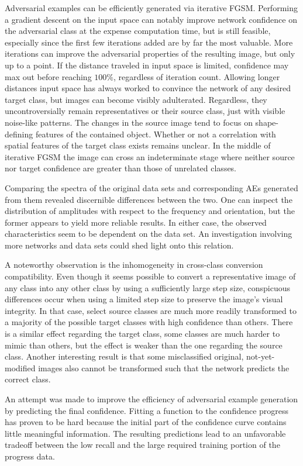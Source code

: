 \documentclass[11pt, a4paper]{article}
\begin{document}
Adversarial examples can be efficiently generated via iterative FGSM. Performing a gradient descent on the input space can notably improve network confidence on the adversarial class at the expense computation time, but is still feasible, especially since the first few iterations added are by far the most valuable. More iterations can improve the adversarial properties of the resulting image, but only up to a point. If the distance traveled in input space is limited, confidence may max out before reaching $100\%$, regardless of iteration count. Allowing longer distances input space has always worked to convince the network of any desired target class, but images can become visibly adulterated. Regardless, they uncontroversially remain representatives or their source class, just with visible noise-like patterns. The changes in the source image tend to focus on shape-defining features of the contained object. Whether or not a correlation with spatial features of the target class exists remains unclear. In the middle of iterative FGSM the image can cross an indeterminate stage where neither source nor target confidence are greater than those of unrelated classes.

Comparing the spectra of the original data sets and corresponding AEs generated from them revealed discernible differences between the two. One can inspect the distribution of amplitudes with respect to the frequency and orientation, but the former appears to yield more reliable results. In either case, the observed characteristics seem to be dependent on the data set. An investigation involving more networks and data sets could shed light onto this relation.

A noteworthy observation is the inhomogeneity in cross-class conversion compatibility. Even though it seems possible to convert a representative image of any class into any other class by using a sufficiently large step size, conspicuous differences occur when using a limited step size to preserve the image's visual integrity. In that case, select source classes are much more readily transformed to a majority of the possible target classes with high confidence than others. There is a similar effect regarding the target class, some classes are much harder to mimic than others, but the effect is weaker than the one regarding the source class. Another interesting result is that some misclassified original, not-yet-modified images also cannot be transformed such that the network predicts the correct class.

An attempt was made to improve the efficiency of adversarial example generation by predicting the final confidence. Fitting a function to the confidence progress has proven to be hard because the initial part of the confidence curve contains little meaningful information. The resulting predictions lead to an unfavorable tradeoff between the low recall and the large required training portion of the progress data.
\end{document}
